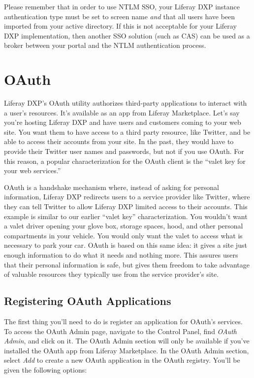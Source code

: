 Please remember that in order to use NTLM SSO, your Liferay DXP instance
authentication type must be set to screen name \emph{and} that all users
have been imported from your active directory. If this is not acceptable
for your Liferay DXP implementation, then another SSO solution (such as
CAS) can be used as a broker between your portal and the NTLM
authentication process.

\section{OAuth}\label{oauth}

Liferay DXP's OAuth utility authorizes third-party applications to
interact with a user's resources. It's available as an app from Liferay
Marketplace. Let's say you're hosting Liferay DXP and have users and
customers coming to your web site. You want them to have access to a
third party resource, like Twitter, and be able to access their accounts
from your site. In the past, they would have to provide their Twitter
user names and passwords, but not if you use OAuth. For this reason, a
popular characterization for the OAuth client is the ``valet key for
your web services.''

OAuth is a handshake mechanism where, instead of asking for personal
information, Liferay DXP redirects users to a service provider like
Twitter, where they can tell Twitter to allow Liferay DXP limited access
to their accounts. This example is similar to our earlier ``valet key''
characterization. You wouldn't want a valet driver opening your glove
box, storage spaces, hood, and other personal compartments in your
vehicle. You would only want the valet to access what is necessary to
park your car. OAuth is based on this same idea: it gives a site just
enough information to do what it needs and nothing more. This assures
users that their personal information is safe, but gives them freedom to
take advantage of valuable resources they typically use from the service
provider's site.

\subsection{Registering OAuth
Applications}\label{registering-oauth-applications}

The first thing you'll need to do is register an application for OAuth's
services. To access the OAuth Admin page, navigate to the Control Panel,
find \emph{OAuth Admin}, and click on it. The OAuth Admin section will
only be available if you've installed the OAuth app from Liferay
Marketplace. In the OAuth Admin section, select \emph{Add} to create a
new OAuth application in the OAuth registry. You'll be given the
following options:

